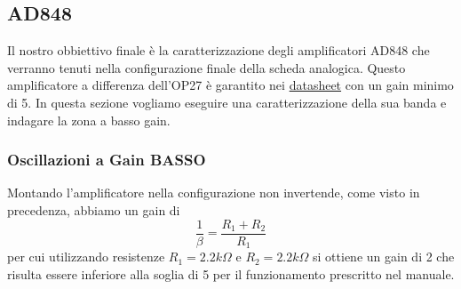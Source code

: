 
\subsection{AD848}

Il nostro obbiettivo finale è la caratterizzazione degli amplificatori AD848 che verranno tenuti nella configurazione finale della scheda analogica.
Questo amplificatore a differenza dell'OP27 è garantito nei \href{https://www.analog.com/media/en/technical-documentation/data-sheets/AD848.pdf}{datasheet} con un gain minimo di 5. In questa sezione vogliamo eseguire una caratterizzazione della sua banda e indagare la zona a basso gain.

\subsubsection{Oscillazioni a Gain BASSO}

Montando l'amplificatore nella configurazione non invertende, come visto in precedenza, abbiamo un gain di $$\frac{1}{\beta} = \frac{R_1+R_2}{R_1}$$ per cui utilizzando resistenze $R_1 = 2.2k\Omega$ e $R_2 = 2.2k\Omega$ si ottiene un gain di 2 che risulta essere inferiore alla soglia di 5 per il funzionamento prescritto nel manuale.

